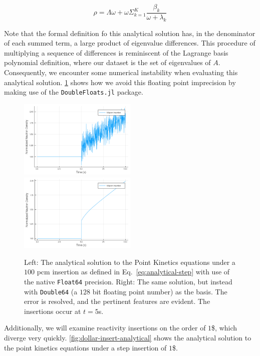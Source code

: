 \documentclass[review,onefignum,onetabnum]{siamart171218}
\begin{document}
\begin{equation}
  \rho = \Lambda\omega + \omega \Sigma_{k=1}^K \frac{\beta_k}{\omega + \lambda_k}
\end{equation}

Note that the formal definition fo this analytical solution has, in the denominator
of each summed term, a large product of eigenvalue differences. This procedure of
multiplying a sequence of differences is reminiscent of the Lagrange basis polynomial
definition, where our dataset is the set of eigenvalues of $A$. Consequently,
we encounter some numerical instability when evaluating this analytical solution.
\cref{fig:single-double-prec} shows how we avoid this floating point
imprecision by making use of the \texttt{DoubleFloats.jl} package.\\

\begin{figure}[htb]
  \includegraphics[width=0.5\textwidth]{../plots/analytical-sols/100pcm_fp_error.png}
  \includegraphics[width=0.5\textwidth]{../plots/analytical-sols/100pcm.png}
  \caption{Left: The analytical solution to the Point Kinetics equations under a $100$ pcm insertion
  as defined in Eq.~\cref{eq:analytical-step} with use of the native \texttt{Float64} precision.
  Right: The same solution, but instead with \texttt{Double64} (a $128$ bit floating point number)
  as the basis. The error is resolved, and the pertinent features are evident. The insertions occur
  at $t = 5$s.}
  \label{fig:single-double-prec}
\end{figure}

Additionally, we will examine reactivity insertions on the order of $1$\$, which
diverge very quickly. \cref{fig:dollar-insert-analytical} shows the analytical
solution to the point kinetics equations under a step insertion of $1$\$.
\end{document}

